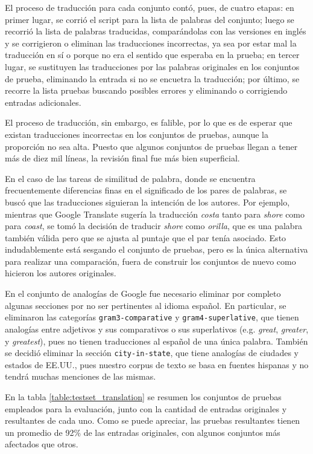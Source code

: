 El proceso de traducción para cada conjunto contó, pues, de cuatro etapas: en primer lugar, se
corrió el script para la lista de palabras del conjunto; luego se recorrió la lista de palabras
traducidas, comparándolas con las versiones en inglés y se corrigieron o eliminan las traducciones
incorrectas, ya sea por estar mal la traducción en sí o porque no era el sentido que esperaba en la
prueba; en tercer lugar, se sustituyen las traducciones por las palabras originales en los conjuntos
de prueba, eliminando la entrada si no se encuetra la traducción; por último, se recorre la lista
pruebas buscando posibles errores y eliminando o corrigiendo entradas adicionales.

El proceso de traducción, sin embargo, es falible, por lo que es de esperar que existan traducciones
incorrectas en los conjuntos de pruebas, aunque la proporción no sea alta. Puesto que algunos
conjuntos de pruebas llegan a tener más de diez mil líneas, la revisión final fue más bien
superficial.

En el caso de las tareas de similitud de palabra, donde se encuentra frecuentemente diferencias
finas en el significado de los pares de palabras, se buscó que las traducciones siguieran la
intención de los autores. Por ejemplo, mientras que Google Translate sugería la traducción
\textit{costa} tanto para \textit{shore} como para \textit{coast}, se tomó la decisión de traducir
\textit{shore} como \textit{orilla}, que es una palabra también válida pero que se ajusta al puntaje
que el par tenía asociado. Esto indudablemente está sesgando el conjunto de pruebas, pero es la
única alternativa para realizar una comparación, fuera de construir los conjuntos de nuevo como
hicieron los autores originales.

En el conjunto de analogías de Google fue necesario eliminar por completo algunas secciones por no
ser pertinentes al idioma español. En particular, se eliminaron las categorías
\texttt{gram3-comparative} y \texttt{gram4-superlative}, que tienen analogías entre adjetivos y sus
comparativos o sus superlativos (e.g. \textit{great}, \textit{greater}, y \textit{greatest}), pues
no tienen traducciones al español de una única palabra. También se decidió eliminar la sección
\texttt{city-in-state}, que tiene analogías de ciudades y estados de EE.UU., pues nuestro corpus de
texto se basa en fuentes hispanas y no tendrá muchas menciones de las mismas.

En la tabla \ref{table:testset_translation} se resumen los conjuntos de pruebas empleados para la
evaluación, junto con la cantidad de entradas originales y resultantes de cada uno. Como se puede
apreciar, las pruebas resultantes tienen un promedio de 92\% de las entradas originales,
con algunos conjuntos más afectados que otros.


